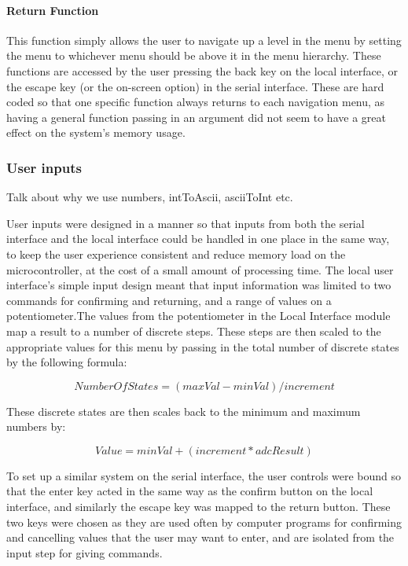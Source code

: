 \documentclass[]{report}
\begin{document}
\paragraph{Return Function}
This function simply allows the user to navigate up a level in the menu by setting the menu to whichever menu should be above it in the menu hierarchy. These functions are accessed by the user pressing the back key on the local interface, or the escape key (or the on-screen option) in the serial interface. These are hard coded so that one specific function always returns to each navigation menu, as having a general function passing in an argument did not seem to have a great effect on the system's memory usage.

\subsubsection{User inputs}
Talk about why we use numbers, intToAscii, asciiToInt etc.

User inputs were designed in a manner so that inputs from both the serial interface and the local interface could be handled in one place in the same way, to keep the user experience consistent and reduce memory load on the microcontroller, at the cost of a small amount of processing time. The local user interface's simple input design meant that input information was limited to two commands for confirming and returning, and a range of values on a potentiometer.The values from the potentiometer in the Local Interface module map a result to a number of discrete steps. These steps are then scaled to the appropriate values for this menu by passing in the total number of discrete states by the following formula:

\begin{equation}
NumberOfStates = (maxVal-minVal)/increment
\end{equation}

These discrete states are then scales back to the minimum and maximum numbers by:

\begin{equation}
Value = minVal + (increment * adcResult)
\end{equation}

To set up a similar system on the serial interface, the user controls were bound so that the enter key acted in the same way as the confirm button on the local interface, and similarly the escape key was mapped to the return button. These two keys were chosen as they are used often by computer programs for confirming and cancelling values that the user may want to enter, and are isolated from the input step for giving commands.
\end{document}
